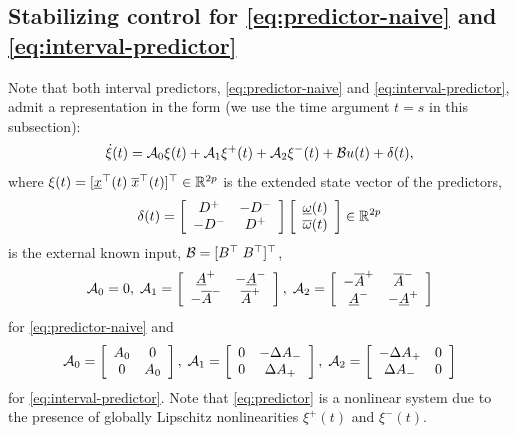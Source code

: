 \documentclass[letterpaper, 10 pt, conference]{ieeeconf}  %
\begin{document}
\subsection{Stabilizing control for \eqref{eq:predictor-naive} and \eqref{eq:interval-predictor}}

Note that both interval predictors, \eqref{eq:predictor-naive} and
\eqref{eq:interval-predictor}, admit a representation in the form (we use the
time argument $t=s$ in this subsection):
\begin{equation}
\dot{\xi}(t)=\mathcal{A}_{0}\xi(t)+\mathcal{A}_{1}\xi^{+}(t)+\mathcal{A}_{2}\xi^{-}(t)+\mathcal{B} u(t)+\delta(t),\label{eq:predictor}
\end{equation}
where $\xi(t)=[\underline{x}^{\top}(t)\;\overline{x}^{\top}(t)]^{\top}\in\mathbb{R}^{2p}$
is the extended state vector of the predictors,
\[
\delta(t)=\left[\begin{array}{cc}
D^{+} & -D^{-}\\
-D^{-} & D^{+}
\end{array}\right]\left[\begin{array}{c}
\underline{\omega}(t)\\
\overline{\omega}(t)
\end{array}\right]\in\mathbb{R}^{2p}
\]
is the external known input, $\mathcal{B}=[B^{\top}\;B^{\top}]^{\top}$, 
\[
\mathcal{A}_{0}=0,\;\mathcal{A}_{1}=\left[\begin{array}{cc}
\underline{A}^{+} & -\underline{A}^{-}\\
-\overline{A}^{-} & \overline{A}^{+}
\end{array}\right],\;\mathcal{A}_{2}=\left[\begin{array}{cc}
-\overline{A}^{+} & \overline{A}^{-}\\
\underline{A}^{-} & -\underline{A}^{+}
\end{array}\right]
\]
for \eqref{eq:predictor-naive} and
\[
\mathcal{A}_{0}=\left[\begin{array}{cc}
A_{0} & 0\\
0 & A_{0}
\end{array}\right],\;\mathcal{A}_{1}=\left[\begin{array}{cc}
0 & -\Delta A_{-}\\
0 & \Delta A_{+}
\end{array}\right],\;\mathcal{A}_{2}=\left[\begin{array}{cc}
-\Delta A_{+} & 0\\
\Delta A_{-} & 0
\end{array}\right]
\]
for \eqref{eq:interval-predictor}. Note that \eqref{eq:predictor}
is a nonlinear system due to the presence of globally Lipschitz nonlinearities
$\xi^{+}(t)$ and $\xi^{-}(t)$. 
\end{document}
